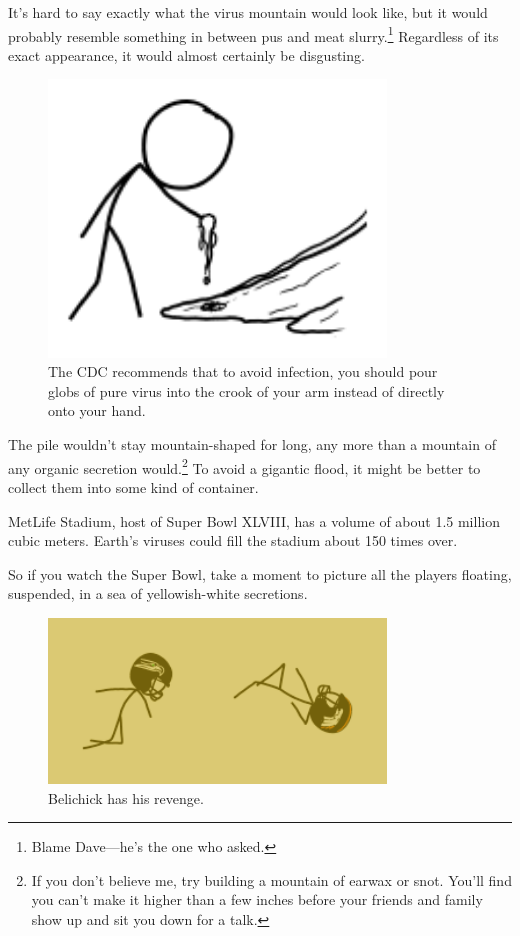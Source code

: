 {{It's hard to say exactly what the virus mountain would look like, but it would probably resemble something in between pus and meat slurry.{\footnote{Blame Dave—he's the one who asked.} } Regardless of its exact appearance, it would almost certainly be disgusting.}

\begin{figure}[!htbp]
\centering
\includegraphics[scale=0.5, max width=0.8\textwidth]{imgs/a/80/virus_hand.png}
\caption{The CDC recommends that to avoid infection, you should pour globs of pure virus into the crook of your arm instead of directly onto your hand.}
\end{figure}

{The pile wouldn't stay mountain-shaped for long, any more than a mountain of any organic secretion would.{\footnote{If you don't believe me, try building a mountain of earwax or snot. You'll find you can't make it higher than a few inches before your friends and family show up and sit you down for a talk.} } To avoid a gigantic flood, it might be better to collect them into some kind of container.}

{MetLife Stadium, host of Super Bowl XLVIII, has a volume of about 1.5 million cubic meters. Earth's viruses could fill the stadium about 150 times over.}

{So if you watch the Super Bowl, take a moment to picture all the players floating, suspended, in a sea of yellowish-white secretions.}

\begin{figure}[!htbp]
\centering
\includegraphics[scale=0.5, max width=0.8\textwidth]{imgs/a/80/virus_floating.png}
\caption{Belichick has his revenge.}
\end{figure}

}
